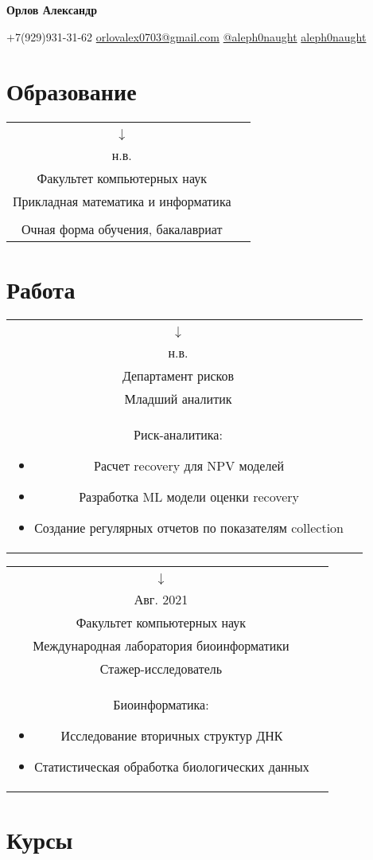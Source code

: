\documentclass{article}
\makeatletter
\renewcommand{\maketitle}{
    \Huge
    \begin{center}
        \textbf{Орлов Александр}
    \end{center}

    \small
    \begin{center}
    \faMobile \hspace{0.1cm} $\boldsymbol{+}$7(929)931-31-62 
    \hfill
    \faEnvelope \hspace{0.1cm} \href{mailto:orlovalex0703@gmail.com}{orlovalex0703@gmail.com}
    \hfill
    \faPaperPlane \hspace{0.1cm} \href{https://t.me/aleph0naught}{@aleph0naught}
    \hfill
    \faGithub \hspace{0.1cm} \href{https://github.com/aleph0naught}{aleph0naught}
    \end{center}
}
\newcommand{\entry}[3]{
	\begin{tabular}{ c | c }
    \begin{minipage}{0.05\linewidth}
    	\begin{center}
    		#1
    	\end{center}
    \end{minipage} 
    &
    \begin{minipage}{0.85\linewidth}
        \textbf{#2} \\ \footnotesize{#3}
    \end{minipage}
    \end{tabular}
}
\newcommand{\interval}[2]{
	#1 \\ $\downarrow$ \\ #2
}
\makeatother
\begin{document}
    \maketitle
    \small
    
    \section{Образование}
        \entry {\interval{2019}{н.в.}}
        {Высшая школа экономики\\
         Факультет компьютерных наук\\
         Прикладная математика и информатика}
        {Специализация <<Машинное обучение и приложения>>\\
        Очная форма обучения, бакалавриат}

    \section{Работа}
        \entry {\interval{Июль 2021}{н.в.}}
        {Тинькофф \\
         Департамент рисков \\
         Младший аналитик}
        {Риск-аналитика:
        	\begin{itemize}
        		\item Расчет recovery для NPV моделей
        		\item Разработка ML модели оценки recovery
        		\item Создание регулярных отчетов по показателям collection
        	\end{itemize}
        }
        
        \vspace{.1cm}
        
        \entry {\interval{Апр. 2021}{Авг. 2021}}
        {Высшая школа экономики \\
         Факультет компьютерных наук \\
         Международная лаборатория биоинформатики \\
         Стажер-исследователь}
        {Биоинформатика:
        	\begin{itemize}
        		\item Исследование вторичных структур ДНК
        		\item Статистическая обработка биологических данных
        	\end{itemize}
        } 
    
    \section{Курсы}
    
\end{document}

